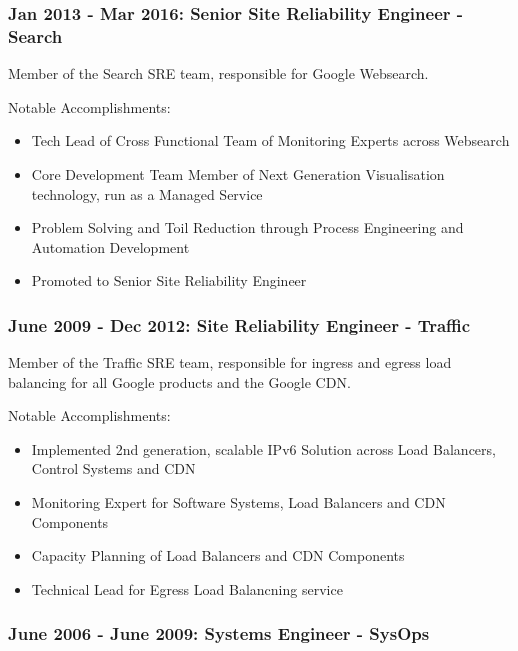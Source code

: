 \documentclass[a4paper, 10pt] {article}
\begin{document}
\subsubsection*{Jan 2013 - Mar 2016: Senior Site Reliability Engineer - Search}

Member of the Search SRE team, responsible for Google Websearch.

\vspace{5mm} %

Notable Accomplishments:

\begin{itemize}[itemsep=2pt,parsep=2pt]
  \item Tech Lead of Cross Functional Team of Monitoring Experts across Websearch
  \item Core Development Team Member of Next Generation Visualisation technology, run as a Managed Service
  \item Problem Solving and Toil Reduction through Process Engineering and Automation Development
  \item Promoted to Senior Site Reliability Engineer
\end{itemize}

\subsubsection*{June 2009 - Dec 2012: Site Reliability Engineer - Traffic}

Member of the Traffic SRE team, responsible for ingress and egress load balancing for all Google products and the Google CDN. 

\vspace{5mm} %

Notable Accomplishments:

\begin{itemize}[itemsep=2pt,parsep=2pt]
  \item Implemented 2nd generation, scalable IPv6 Solution across Load Balancers, Control Systems and CDN
  \item Monitoring Expert for Software Systems, Load Balancers and CDN Components 
  \item Capacity Planning of Load Balancers and CDN Components
  \item Technical Lead for Egress Load Balancning service
\end{itemize}

\subsubsection*{June 2006 - June 2009: Systems Engineer - SysOps}
\end{document}
